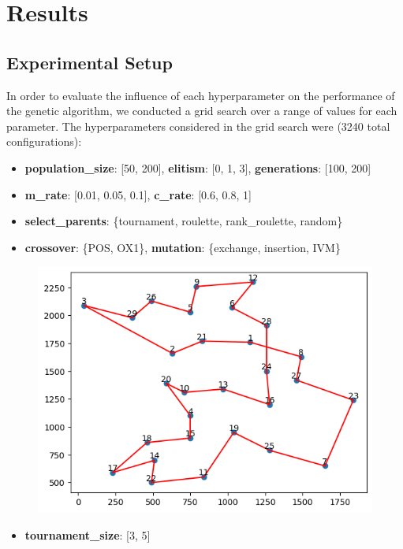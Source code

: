\documentclass[11pt]{article}
\begin{document}
\section{Results}
\subsection{Experimental Setup}
In order to evaluate the influence of each hyperparameter on the performance of the genetic algorithm, we conducted a grid search over a range of values for each parameter. The hyperparameters considered in the grid search were (3240 total configurations):
\begin{itemize}
    \item \textbf{population\_size}: [50, 200], \textbf{elitism}: [0, 1, 3], \textbf{generations}: [100, 200]
    \item \textbf{m\_rate}: [0.01, 0.05, 0.1], \textbf{c\_rate}: [0.6, 0.8, 1]
    \item \textbf{select\_parents}: \{tournament, roulette, rank\_roulette, random\}
    \item \textbf{crossover}: \{POS, OX1\}, \textbf{mutation}: \{exchange, insertion, IVM\}
\end{itemize}

\begin{figure}
    \centering
    \includegraphics[width=\linewidth]{../results/best_chromosme.png}
    \label{fig:best_route}
\end{figure}

\begin{itemize}
    \item \textbf{tournament\_size}: [3, 5]
\end{itemize}
\end{document}
